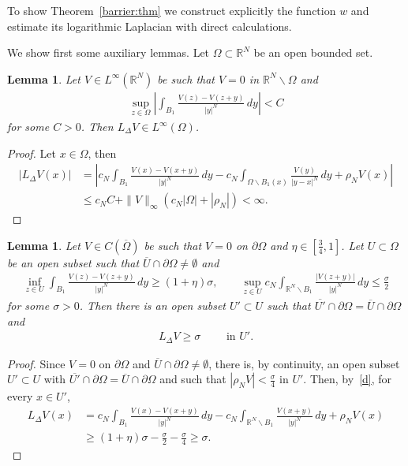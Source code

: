 \documentclass[11pt]{article}
\newcommand{\R}{\mathbb{R}}
\numberwithin{equation}{section}
\newtheorem{lemma}[theorem]{Lemma}
\begin{document}
To show Theorem~\ref{barrier:thm} we construct explicitly the function $w$ and estimate its logarithmic Laplacian with direct calculations. 

We show first some auxiliary lemmas. Let $\Omega\subset\R^N$ be an open bounded set. 

\begin{lemma}\label{Ldelta}
Let $V\in L^\infty(\R^N)$ be such that $V=0$ in $\R^N\backslash \Omega$ and
\begin{align}\label{C:bd}
\sup_{z\in\Omega}\left|\int_{B_1}
\frac{
V(z)
-V(z+y)}{|y|^N}\, dy\right|<C
\end{align}
for some $C>0$. Then $L_\Delta V\in L^\infty(\Omega)$. 
\end{lemma}
\begin{proof}
Let $x\in \Omega$, then
\begin{align*}
|L_\Delta V(x)|
&=\left|c_N\int_{B_1}\frac{V(x)-V(x+y)}{|y|^N}\, dy-c_N\int_{\Omega\backslash B_1(x)}\frac{V(y)}{|y-x|^N}\, dy+\rho_N V(x)\right|\\
&\leq c_NC+\|V\|_\infty(c_N|\Omega|+|\rho_N|)<\infty.
\end{align*}
\end{proof}

\begin{lemma}\label{V:lem:1}
Let $V\in C(\overline{\Omega})$ be such that $V=0$ on $\partial\Omega$ and $\eta\in[\frac{3}{4},1]$. Let $U\subset \Omega$ be an open subset such that $\overline{U}\cap\partial\Omega\neq \emptyset$ and
\begin{align}\label{d}
\inf_{z\in U}
\int_{B_1}
\frac{
V(z)
-V(z+y)}{|y|^N}\, dy\geq (1+\eta)\sigma,\qquad 
\sup_{z\in U}
c_N\int_{\R^N\backslash B_1}
\frac{
|V(z+y)|}{|y|^N}\, dy\leq \frac{\sigma}{2}
\end{align}
for some $\sigma>0$. Then there is an open subset $U'\subset U$ such that $\overline{U'}\cap\partial\Omega=\overline{U}\cap\partial\Omega$ and 
\begin{align*}
L_\Delta V\geq \sigma\qquad \text{ in $U'$.}
\end{align*}
\end{lemma}
\begin{proof}
Since $V=0$ on $\partial \Omega$ and $\overline{U}\cap\partial\Omega\neq \emptyset$, there is, by continuity, an open subset $U'\subset U$ with $\overline{U'}\cap\partial\Omega=\overline{U}\cap\partial\Omega$ and such that $|\rho_N V|<\frac{\sigma}{4}$ in $U'$. Then, by~\eqref{d}, for every $x\in U'$,
\begin{align*}
L_\Delta V(x)
&=c_N\int_{B_1}\frac{V(x)-V(x+y)}{|y|^N}\, dy-c_N\int_{\R^N\backslash B_1}\frac{V(x+y)}{|y|^N}\, dy+\rho_N V(x)\\
&\geq (1+\eta)\sigma-\frac{\sigma}{2}-\frac{\sigma}{4}\geq \sigma.
\end{align*}
\end{proof}
\end{document}
